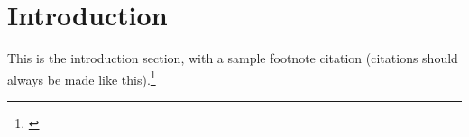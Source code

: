 \documentclass[../main.tex]{subfiles}
\begin{document}
    
\chapter{Introduction}
    
This is the introduction section, with a sample footnote citation (citations should always be made like this).\footnote{\cite{UniversityofPennsylvania-WRDSWhartonResearchDataServices2019CompustatIQ}}
\end{document}
